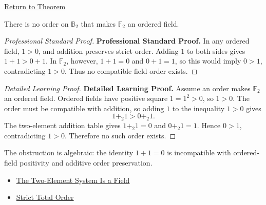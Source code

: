 \newpage
{}
\label{prf:two-element-system-not-ordered-field}

\begin{remark*}[Return]
\hyperref[thm:two-element-system-not-ordered-field]{Return to Theorem}
\end{remark*}

\begin{theorem*}
There is no order on \(\mathbb{B}_2\) that makes \(\mathbb{F}_2\) an ordered
field.
\end{theorem*}

\begin{proof}[Professional Standard Proof]
\LRAProofBodyStart
\textbf{Professional Standard Proof.}
In any ordered field, \(1>0\), and addition preserves strict order. Adding
\(1\) to both sides gives \(1+1>0+1\). In \(\mathbb{F}_2\), however,
\(1+1=0\) and \(0+1=1\), so this would imply \(0>1\), contradicting
\(1>0\). Thus no compatible field order exists.
\end{proof}

\begin{proof}[Detailed Learning Proof]
\LRAProofBodyStart
\textbf{Detailed Learning Proof.}
Assume an order makes \(\mathbb{F}_2\) an ordered field. Ordered fields have
positive square \(1=1^2>0\), so \(1>0\). The order must be compatible with
addition, so adding \(1\) to the inequality \(1>0\) gives
\[
1+_2 1 > 0+_2 1.
\]
The two-element addition table gives \(1+_2 1=0\) and \(0+_2 1=1\). Hence
\(0>1\), contradicting \(1>0\). Therefore no such order exists.
\end{proof}

\begin{remark*}
The obstruction is algebraic: the identity \(1+1=0\) is incompatible with
ordered-field positivity and additive order preservation.
\end{remark*}

\begin{dependencies}
\begin{itemize}
  \item \hyperref[thm:two-element-system-is-field]{The Two-Element System Is a Field}
  \item \hyperref[def:strict-total-order]{Strict Total Order}
\end{itemize}
\end{dependencies}

\clearpage

